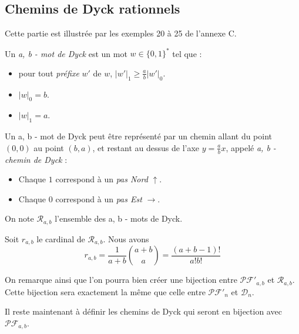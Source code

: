\subsection{Chemins de Dyck rationnels}

Cette partie est illustrée par les exemples 20 à 25 de l'annexe C.

\begin{definition}
    Un \emph{a, b - mot de Dyck} est un mot $w \in \{0,1\}^*$ tel que :
    \begin{itemize}
        \item pour tout \emph{préfixe} $w'$ de $w$,
            $\displaystyle |w'|_1 \geqslant \frac{a}{b}|w'|_0$.
        \item $|w|_0 = b$.
        \item $|w|_1 = a$.
    \end{itemize}
\end{definition}

Un a, b - mot de Dyck peut être représenté par un chemin allant du point
$(0,0)$ au point $(b,a)$, et restant au dessus de l'axe $y = \frac{a}{b}x$,
appelé \emph{a, b - chemin de Dyck} :
\begin{itemize}
    \item Chaque $1$ correspond à un \emph{pas Nord} $\uparrow$. 
    \item Chaque $0$ correspond à un \emph{pas Est} $\rightarrow$.
\end{itemize}

On note $\mathcal{R}_{a, b}$ l'ensemble des a, b - mots de Dyck.

\begin{theorem}[Bizley, 1954]
    Soit $r_{a,b}$ le cardinal de $\mathcal{R}_{a,b}$.
    Nous avons $$r_{a,b} = \frac{1}{a+b} \binom {a+b}{a} =
    \frac{(a+b-1)!}{a!b!}$$
\end{theorem}

On remarque ainsi que l'on pourra bien créer une bijection entre
$\mathcal{PF'}_{a,b}$ et $\mathcal{R}_{a,b}$.
Cette bijection sera exactement la même que celle entre $\mathcal{PF'}_n$
et $\mathcal{D}_{n}$.

Il reste maintenant à définir les chemins de Dyck qui seront en bijection
avec $\mathcal{PF}_{a,b}$.

